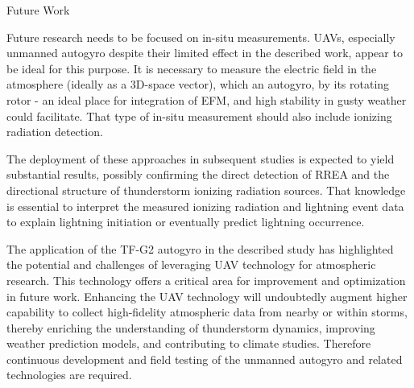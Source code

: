 \sec Future Work

Future research needs to be  focused on in-situ measurements. UAVs, especially unmanned autogyro despite their limited effect in the described work, appear to be ideal for this purpose. It is necessary to measure the electric field in the atmosphere (ideally as a 3D-space vector), which an autogyro, by its rotating rotor - an ideal place for integration of EFM, and high stability in gusty weather could facilitate. That type of in-situ measurement should also include ionizing radiation detection.

The deployment of these approaches in subsequent studies is expected to yield substantial results, possibly confirming the direct detection of RREA and the directional structure of thunderstorm ionizing  radiation sources. That knowledge is essential to interpret the measured ionizing radiation and lightning event data to explain lightning initiation or eventually predict lightning occurrence.

The application of the TF-G2 autogyro in the described study has highlighted the potential and challenges of leveraging UAV technology for atmospheric research. This technology offers a critical area for improvement and optimization in future work. Enhancing the UAV technology will undoubtedly augment higher capability to collect high-fidelity atmospheric data from nearby or within storms, thereby enriching the understanding of thunderstorm dynamics, improving weather prediction models, and contributing to climate studies. Therefore continuous development and field testing of the unmanned autogyro and related technologies are required.
